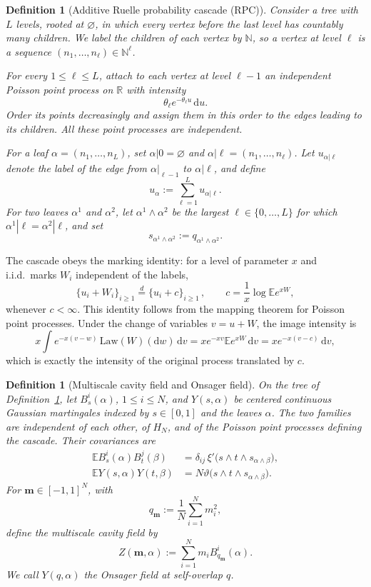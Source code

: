 \documentclass[a4paper,10pt,reqno]{amsart}
\numberwithin{equation}{section}
\newtheorem{definition}[proposition]{Definition}%
\newcommand{\dR}{\mathbb{R}}%
\newcommand{\dN}{\mathbb{N}}%
\newcommand{\dE}{\mathbb{E}}%
\newcommand{\Law}{\mathrm{Law}}
\newcommand{\dd}{\mathrm{d}}
\newcommand{\bfm}{\mathbf{m}}
\begin{document}
	\begin{definition}[Additive Ruelle probability cascade (RPC)]\label{def:ising-rpc}
		Consider a tree with $L$ levels, rooted at $\varnothing$, in which every vertex before the last level has
		countably many children. We label the children of each vertex by $\dN$, so a vertex at level $\ell$ is a sequence
		$(n_1,\ldots,n_\ell)\in\dN^\ell$.
		
		For every $1\le\ell\le L$, attach to each vertex at level $\ell-1$ an independent Poisson point process on $\dR$
		with intensity
		\[
		\theta_\ell e^{-\theta_\ell u}\,\dd u.
		\]
		Order its points decreasingly and assign them in this order to the edges leading to its children. All these point
		processes are independent.
		
		For a leaf $\alpha=(n_1,\ldots,n_L)$, set $\alpha|0=\varnothing$ and
		$\alpha|\ell=(n_1,\ldots,n_\ell)$. Let $u_{\alpha|\ell}$ denote the label of the edge from
		$\alpha|_{\ell-1}$ to $\alpha|\ell$, and define
		\[
		u_\alpha:=\sum_{\ell=1}^L u_{\alpha|\ell}.
		\]
		For two leaves $\alpha^1$ and $\alpha^2$, let $\alpha^1\wedge\alpha^2$ be the largest
		$\ell\in\{0,\ldots,L\}$ for which $\alpha^1|\ell=\alpha^2|\ell$, and set
		\[
		s_{\alpha^1\wedge\alpha^2}:=q_{\alpha^1\wedge\alpha^2}.
		\]
	\end{definition}
	
	The cascade obeys the marking identity: for a level of parameter $x$ and i.i.d.\ marks $W_i$ independent of
	the labels,
	\begin{equation}\label{eq:ising-marking}
		\{u_i+W_i\}_{i\ge1}\stackrel d=\{u_i+c\}_{i\ge1}\,,\qquad c=\frac1x\log\dE e^{xW},
	\end{equation}
	whenever $c<\infty$. This identity follows from the mapping theorem
	for Poisson point processes. Under the change of variables
	$v=u+W$, the image intensity is
	\[
	x\int e^{-x(v-w)}\,\Law(W)(\dd w)\,\dd v
	=x e^{-xv}\dE e^{xW}\,\dd v
	=x e^{-x(v-c)}\,\dd v,
	\]
	which is exactly the intensity of the original process translated by $c$.
	
	
	\begin{definition}[Multiscale cavity field and Onsager field]\label{def:ising-cavity}
		On the tree of Definition~\ref{def:ising-rpc}, let
		$B_s^i(\alpha)$, $1\le i\le N$, and $Y(s,\alpha)$ be centered
		continuous Gaussian martingales indexed by $s\in[0,1]$ and the
		leaves $\alpha$. The two families are independent of each other,
		of $H_N$, and of the Poisson point processes defining the
		cascade. Their covariances are
		\begin{align*}
			\dE B_s^i(\alpha)B_t^j(\beta)
			&=
			\delta_{ij}\,
			\xi'\bigl(s\wedge t\wedge
			s_{\alpha\wedge\beta}\bigr),\\
			\dE Y(s,\alpha)Y(t,\beta)
			&=
			N\vartheta\bigl(s\wedge t\wedge
			s_{\alpha\wedge\beta}\bigr).
		\end{align*}
		For $\bfm\in[-1,1]^N$, with
		\[
		q_\bfm:=\frac1N\sum_{i=1}^N m_i^2,
		\]
		define the multiscale cavity field by
		\[
		Z(\bfm,\alpha)
		:=
		\sum_{i=1}^N m_i B_{q_\bfm}^i(\alpha).
		\]
		We call $Y(q,\alpha)$ the Onsager field at self-overlap $q$.
	\end{definition}
	
\end{document}
